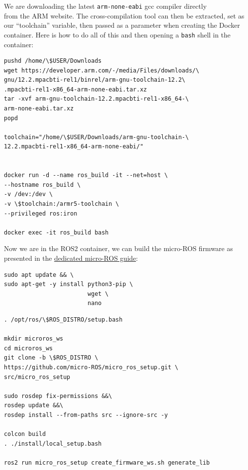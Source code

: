 \documentclass[10pt]{article}
\begin{document}
We are downloading the latest \verb|arm-none-eabi| gcc compiler directly \\from the ARM website.
The cross-compilation tool can then be extracted, set as our ``toolchain'' variable, then passed as a parameter when creating the Docker container.
Here is how to do all of this and then opening a \verb|bash| shell in the container:
\begin{tcolorbox}
\begin{verbatim}
pushd /home/\$USER/Downloads
wget https://developer.arm.com/-/media/Files/downloads/\
gnu/12.2.mpacbti-rel1/binrel/arm-gnu-toolchain-12.2\
.mpacbti-rel1-x86_64-arm-none-eabi.tar.xz
tar -xvf arm-gnu-toolchain-12.2.mpacbti-rel1-x86_64-\
arm-none-eabi.tar.xz
popd

toolchain="/home/\$USER/Downloads/arm-gnu-toolchain-\
12.2.mpacbti-rel1-x86_64-arm-none-eabi/"


docker run -d --name ros_build -it --net=host \
--hostname ros_build \
-v /dev:/dev \
-v \$toolchain:/armr5-toolchain \
--privileged ros:iron

docker exec -it ros_build bash
\end{verbatim}
\end{tcolorbox}


Now we are in the ROS2 container, we can build the micro-ROS firmware as presented in the \href{https://micro.ros.org/docs/tutorials/advanced/create\_custom\_static\_library}{dedicated micro-ROS guide}:
\begin{tcolorbox}
\begin{verbatim}
sudo apt update && \
sudo apt-get -y install python3-pip \
                        wget \
                        nano
\end{verbatim}
\end{tcolorbox}

\begin{tcolorbox}
\begin{verbatim}
. /opt/ros/\$ROS_DISTRO/setup.bash

mkdir microros_ws
cd microros_ws
git clone -b \$ROS_DISTRO \
https://github.com/micro-ROS/micro_ros_setup.git \
src/micro_ros_setup

sudo rosdep fix-permissions &&\
rosdep update &&\
rosdep install --from-paths src --ignore-src -y

colcon build
. ./install/local_setup.bash

ros2 run micro_ros_setup create_firmware_ws.sh generate_lib
\end{verbatim}
\end{tcolorbox}
\end{document}
